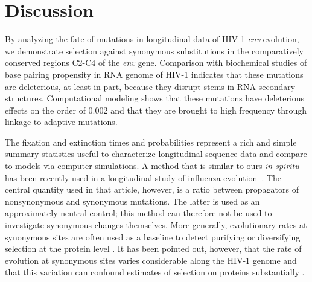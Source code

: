 \documentclass[rmp, twocolumn]{revtex4}
\newcommand{\env}{\textit{env}}
\begin{document}
\section{Discussion}
By analyzing the fate of mutations in longitudinal data of HIV-1 \env{} evolution,
we demonstrate selection against synonymous substitutions in the comparatively
conserved regions C2-C4 of the \env{} gene. Comparison with biochemical studies
of base pairing propensity in RNA genome of HIV-1 indicates that these
mutations are deleterious, at least in part, because they disrupt stems in RNA
secondary structures. Computational modeling shows that these mutations have
deleterious effects on the order of $0.002$ and that they are brought to high
frequency through linkage to adaptive mutations.

The fixation and extinction times and probabilities represent a rich and simple
summary statistics useful to characterize longitudinal sequence data and compare
to models via computer simulations. A method that is similar to ours {\it in
spiritu} has been recently used in a longitudinal study of influenza
evolution~\citep{strelkowa_clonal_2012}. The central quantity used in that
article, however, is a ratio between propagators of nonsynonymous and synonymous
mutations. The latter is used as an approximately neutral control; this method
can therefore not be used to investigate synonymous changes themselves. More
generally, evolutionary rates at synonymous sites are often used as a baseline
to detect purifying or diversifying selection at the protein level
\cite{Hurst:2002p32608}. It has been pointed out, however, that the rate of
evolution at synonymous sites varies considerable along the HIV-1 genome
\citep{mayrose_towards_2007} and that this variation can confound estimates of
selection on proteins substantially \citep{ngandu_extensive_2008}.
\end{document}
